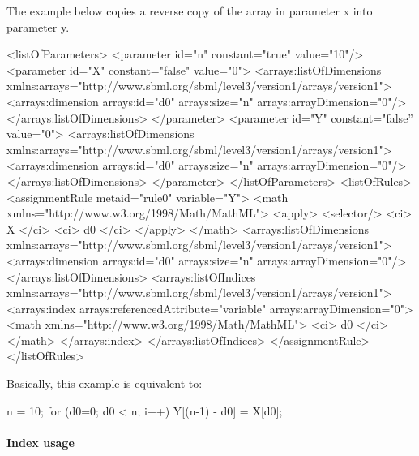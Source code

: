 The example below copies a reverse copy of the array in parameter x into parameter y.    

\begin{example}[showstringspaces=false]
<listOfParameters>
    <parameter id="n" constant="true" value="10"/>
    <parameter id="X" constant="false" value="0">
        <arrays:listOfDimensions
            xmlns:arrays="http://www.sbml.org/sbml/level3/version1/arrays/version1">
            <arrays:dimension arrays:id="d0" arrays:size="n" arrays:arrayDimension="0"/>
        </arrays:listOfDimensions>
    </parameter>
    <parameter id="Y" constant="false'' value="0">
        <arrays:listOfDimensions
            xmlns:arrays="http://www.sbml.org/sbml/level3/version1/arrays/version1">
            <arrays:dimension arrays:id="d0" arrays:size="n" arrays:arrayDimension="0"/>
        </arrays:listOfDimensions>
    </parameter>
</listOfParameters>
<listOfRules>
    <assignmentRule metaid="rule0" variable="Y">
        <math
            xmlns="http://www.w3.org/1998/Math/MathML">
            <apply>
                <selector/>
                <ci> X </ci>
                <ci> d0 </ci>
            </apply>
        </math>
        <arrays:listOfDimensions
            xmlns:arrays="http://www.sbml.org/sbml/level3/version1/arrays/version1">
            <arrays:dimension arrays:id="d0" arrays:size="n" arrays:arrayDimension="0"/>
        </arrays:listOfDimensions>
        <arrays:listOfIndices
            xmlns:arrays="http://www.sbml.org/sbml/level3/version1/arrays/version1">
            <arrays:index arrays:referencedAttribute="variable" arrays:arrayDimension="0">
                <math
                    xmlns="http://www.w3.org/1998/Math/MathML">
                    <ci> d0 </ci>
                </math>
            </arrays:index>
        </arrays:listOfIndices>
    </assignmentRule>
</listOfRules>
\end{example}

Basically, this example is equivalent to:

\begin{example}
n = 10;
for (d0=0; d0 < n; i++)  {
       Y[(n-1)  - d0]  = X[d0];
}
\end{example}

\paragraph{Index usage}

